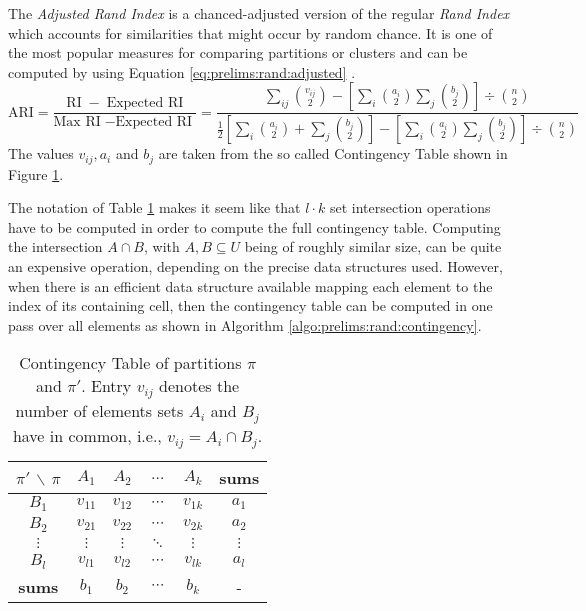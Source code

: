 		The \textit{Adjusted Rand Index} is a chanced-adjusted version of the regular \textit{Rand Index} which accounts for similarities that might occur by random chance.
		It is one of the most popular measures for comparing partitions or clusters and can be computed by using Equation \ref{eq:prelims:rand:adjusted} \cite{sundqvistAdjustingAdjustedRand2020}.
		\begin{equation}
			\label{eq:prelims:rand:adjusted}
			\mathrm{ARI} = \frac{\mathrm{RI}\; - \;\text{Expected RI}}{\text{Max RI}\; - \text{Expected RI} \;} = \frac{\sum\nolimits_{ij} \binom{v_{ij}}{2} - \left[ \sum\nolimits_i \binom{a_i}{2} \sum\nolimits_j \binom{b_j}{2} \right] \div \binom{n}{2}}{\frac{1}{2} \left[ \sum\nolimits_i \binom{a_i}{2} +  \sum\nolimits_j \binom{b_j}{2} \right] - \left[ \sum\nolimits_i \binom{a_i}{2} \sum\nolimits_j \binom{b_j}{2} \right] \div \binom{n}{2}}
		\end{equation}
		The values $v_{ij}, a_i$ and $b_j$ are taken from the so called Contingency Table shown in Figure \ref{fig:prelims:rand:contingency}.
		
		The notation of Table \ref{fig:prelims:rand:contingency} makes it seem like that $l \cdot k$ set intersection operations have to be computed in order to compute the full contingency table.
		Computing the intersection $A \cap B$, with $A, B \subseteq U$ being of roughly similar size, can be quite an expensive operation, depending on the precise data structures used.
		However, when there is an efficient data structure available mapping each element to the index of its containing cell, then the contingency table can be computed in one pass over all elements as shown in Algorithm \ref{algo:prelims:rand:contingency}.
		
		\begin{table}[h!]
			\centering
			\begin{tabular}{c|cccc|c}
				$\pi'$ $\backslash$ $\pi$ & $A_1$ & $A_2$ & $\ldots$ & $A_k$ & \textbf{sums} \\
				\toprule
				$B_1$ & $v_{11}$ & $v_{12}$ & $\cdots$ & $v_{1k}$ & $a_1$ \\
				$B_2$ & $v_{21}$ & $v_{22}$ & $\cdots$ & $v_{2k}$ & $a_2$ \\
				$\vdots$ & $\vdots$ & $\vdots$ & $\ddots$ & $\vdots$ & $\vdots$\\
				$B_l$ & $v_{l1}$ & $v_{l2}$ & $\cdots$ & $v_{lk}$ & $a_l$ \\
				\midrule
				\textbf{sums} & $b_1$ & $b_2$ & $\cdots$ & $b_k$ & -
			\end{tabular}
			\caption{Contingency Table of partitions $\pi$ and $\pi'$. Entry $v_{ij}$ denotes the number of elements sets $A_i$ and $B_j$ have in common, i.e., $v_{ij} = A_i \cap B_j$.}
			\label{fig:prelims:rand:contingency}
		\end{table}
		
